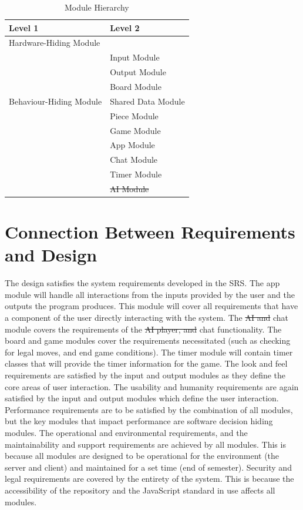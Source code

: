 \documentclass[12pt, titlepage]{article}
\begin{document}
\begin{table}[h!]
\centering
\begin{tabular}{p{} p{}}
\toprule
\textbf{Level 1} & \textbf{Level 2}\\
\midrule

{Hardware-Hiding Module} & ~ \\
\midrule

\multirow{7}{0.3\textwidth}{Behaviour-Hiding Module} 
& Input Module\\
& Output Module\\
& Board Module\\
& Shared Data Module\\
& Piece Module \\
& Game Module\\
\midrule

\multirow{3}{0.3\textwidth}{Software Decision Module}
& App Module\\
& Chat Module\\
& Timer Module\\
& \sout{AI Module}\\
\bottomrule

\end{tabular}
\caption{Module Hierarchy}
\label{TblMH}
\end{table}

\section{Connection Between Requirements and Design} \label{SecConnection}

The design satisfies the system requirements developed in the SRS. The app module will handle all interactions from the inputs provided by the user and the outputs the program produces. This module will cover all requirements that have a component of the user directly interacting with the system. The \sout{AI and} chat module covers the requirements of the \sout{AI player, and} chat functionality. The board and game modules cover the requirements necessitated (such as checking for legal moves, and end game conditions). The timer module will contain timer classes that will provide the timer information for the game. The look and feel requirements are satisfied by the input and output modules as they define the core areas of user interaction. The usability and humanity requirements are again satisfied by the input and output modules which define the user interaction. Performance requirements are to be satisfied by the combination of all modules, but the key modules that impact performance are software decision hiding modules. The operational and environmental requirements, and the maintainability and support requirements are achieved by all modules. This is because all modules are designed to be operational for the environment (the server and client) and maintained for a set time (end of semester). Security and legal requirements are covered by the entirety of the system. This is because the accessibility of the repository and the JavaScript standard in use affects all modules.
\end{document}
